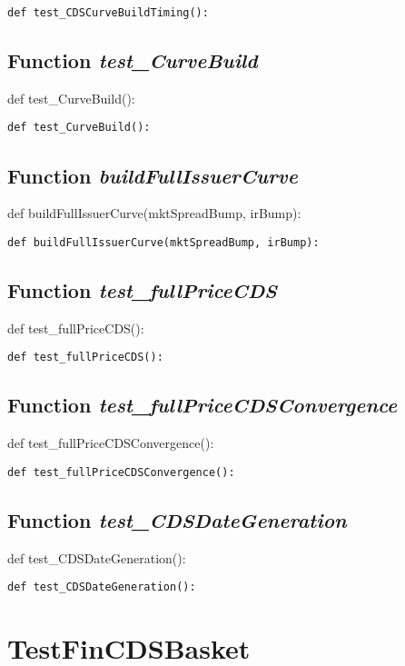 \documentclass[twoside,11pt]{book}
\begin{document}
\begin{lstlisting}
def test_CDSCurveBuildTiming():
\end{lstlisting}

\subsection{Function {\it test\_CurveBuild}}
def test\_CurveBuild():

\begin{lstlisting}
def test_CurveBuild():
\end{lstlisting}

\subsection{Function {\it buildFullIssuerCurve}}
def buildFullIssuerCurve(mktSpreadBump, irBump):

\begin{lstlisting}
def buildFullIssuerCurve(mktSpreadBump, irBump):
\end{lstlisting}

\subsection{Function {\it test\_fullPriceCDS}}
def test\_fullPriceCDS():

\begin{lstlisting}
def test_fullPriceCDS():
\end{lstlisting}

\subsection{Function {\it test\_fullPriceCDSConvergence}}
def test\_fullPriceCDSConvergence():

\begin{lstlisting}
def test_fullPriceCDSConvergence():
\end{lstlisting}

\subsection{Function {\it test\_CDSDateGeneration}}
def test\_CDSDateGeneration():

\begin{lstlisting}
def test_CDSDateGeneration():
\end{lstlisting}


\newpage
\section{TestFinCDSBasket}
\end{document}
